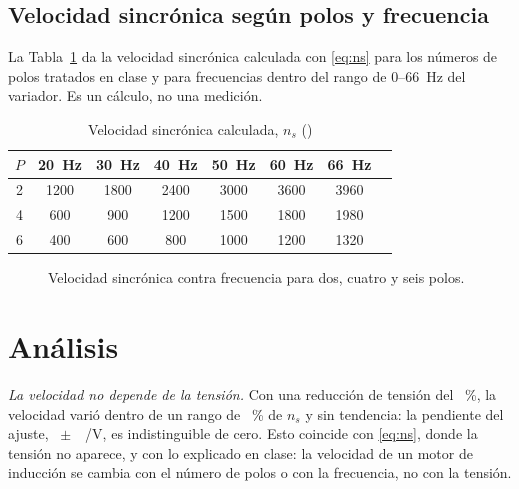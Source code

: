 \documentclass[conference]{IEEEtran}
\begin{document}
\subsection{Velocidad sincrónica según polos y frecuencia}
La Tabla~\ref{tab:ns} da la velocidad sincrónica calculada con \eqref{eq:ns} para los números de polos tratados en clase y para frecuencias dentro del rango de \SI{0}{}--\SI{66}{Hz} del variador. Es un cálculo, no una medición.

\begin{table}[!tb]
\centering
\caption{Velocidad sincrónica calculada, $n_s$ (\si{\rpm})}
\label{tab:ns}
\footnotesize
\begin{tabular}{@{}cccccccc@{}}
\toprule
$P$ & \SI{20}{Hz} & \SI{30}{Hz} & \SI{40}{Hz} & \SI{50}{Hz} & \SI{60}{Hz} & \SI{66}{Hz} \\
\midrule
2 & 1200 & 1800 & 2400 & 3000 & 3600 & 3960 \\
4 & 600 & 900 & 1200 & 1500 & 1800 & 1980 \\
6 & 400 & 600 & 800 & 1000 & 1200 & 1320 \\
\bottomrule
\end{tabular}
\end{table}

\begin{figure}[!tb]
\centering
{}
\caption{Velocidad sincrónica contra frecuencia para dos, cuatro y seis polos.}
\label{fig:ns}
\end{figure}

\section{Análisis}
\emph{La velocidad no depende de la tensión.} Con una reducción de tensión del \ClVred~\%, la velocidad varió dentro de un rango de \ClRangePct~\% de $n_s$ y sin tendencia: la pendiente del ajuste, \ClSlope~$\pm$~\ClSlopeSE~\si{\rpm/V}, es indistinguible de cero. Esto coincide con \eqref{eq:ns}, donde la tensión no aparece, y con lo explicado en clase: la velocidad de un motor de inducción se cambia con el número de polos o con la frecuencia, no con la tensión.
\end{document}
